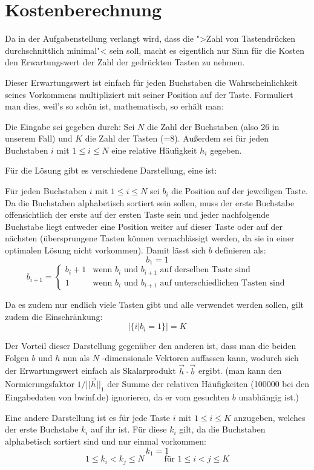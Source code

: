 \documentclass[11pt,a4paper]{article}
\begin{document}
\section{Kostenberechnung}
Da in der Aufgabenstellung verlangt wird, dass die ">Zahl von Tastendrücken durchschnittlich minimal"< sein soll, macht es eigentlich nur Sinn für die Kosten den Erwartungswert der Zahl der gedrückten Tasten zu nehmen.

Dieser Erwartungswert ist einfach für jeden Buchstaben die Wahrscheinlichkeit seines Vorkommens multipliziert mit seiner Position auf der Taste. Formuliert man dies, weil's so schön ist, mathematisch, so erhält man:

Die Eingabe sei gegeben durch: Sei $N$ die Zahl der Buchstaben (also 26 in unserem Fall) und $K$ die Zahl der Tasten (=8). Außerdem sei für jeden Buchstaben $i$ mit $1 \leq i \leq N$ eine relative Häufigkeit $h_i$ gegeben.

Für die Lösung gibt es verschiedene Darstellung, eine ist:

Für jeden Buchstaben $i$ mit $1\leq i \leq N$ sei $b_i$ die Position auf der jeweiligen Taste. Da die Buchstaben alphabetisch sortiert sein sollen, muss der erste Buchstabe offensichtlich der erste auf der ersten Taste sein und jeder nachfolgende Buchstabe liegt entweder eine Position weiter auf dieser Taste oder auf der nächsten (übersprungene Tasten können vernachlässigt werden, da sie in einer optimalen Lösung nicht vorkommen). Damit lässt sich $b$ definieren als:
\[b_1 = 1\]
\[b_{i+1} = \begin{cases}
b_{i} + 1 & \text{wenn $b_i$ und $b_{i+1}$ auf derselben Taste sind}\\
1 & \text{wenn $b_i$ und $b_{i+1}$ auf unterschiedlichen Tasten sind}
\end{cases}\]

Da es zudem nur endlich viele Tasten gibt und alle verwendet werden sollen, gilt zudem die Einschränkung:
\[|\{i | b_i = 1\}| = K\]

Der Vorteil dieser Darstellung gegenüber den anderen ist, dass man die beiden Folgen $b$ und $h$ nun als $N$ -dimensionale Vektoren auffassen kann, wodurch sich der Erwartungswert einfach als Skalarprodukt $\vec{h}\cdot\vec{b}$ ergibt. (man kann den Normierungsfaktor $1/||\vec{h}||_1$ der Summe der relativen Häufigkeiten (100000 bei den Eingabedaten von bwinf.de) ignorieren, da er vom gesuchten $b$ unabhängig ist.)


Eine andere Darstellung ist es für jede Taste $i$ mit $1\leq i\leq K$ anzugeben, welches der erste Buchstabe $k_i$ auf ihr ist. Für diese $k_i$ gilt, da die Buchstaben alphabetisch sortiert sind und nur einmal vorkommen:
\[k_1 = 1\]
\[ 1 \leq k_i < k_j \leq N \qquad \text{ für }1 \leq i < j \leq K \]
\end{document}
